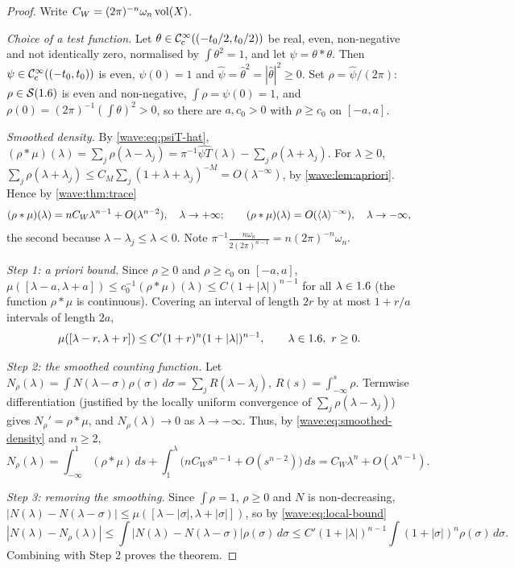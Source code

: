 \begin{proof}
Write $C_W=(2\pi)^{-n}\omega_n\operatorname{vol}(X)$.

\emph{Choice of a test function.} Let $\theta\in\mathcal{C}^\infty_{\mathrm{c}}((-t_0/2,t_0/2))$ be real, even,
non-negative and not identically zero, normalised by $\int\theta^2=1$, and let
$\psi=\theta*\theta$. Then $\psi\in\mathcal{C}^\infty_{\mathrm{c}}((-t_0,t_0))$ is even, $\psi(0)=1$ and
$\hat\psi=\hat\theta^2=|\hat\theta|^2\ge0$. Set $\rho=\hat\psi/(2\pi)$: $\rho\in\mathcal{S}(1.6)$ is even and
non-negative, $\int\rho=\psi(0)=1$, and $\rho(0)=(2\pi)^{-1}(\int\theta)^2>0$, so there are
$a,c_0>0$ with $\rho\ge c_0$ on $[-a,a]$.

\emph{Smoothed density.} By \eqref{wave:eq:psiT-hat},
$(\rho*\mu)(\lambda)=\sum_j\rho(\lambda-\lambda_j)=\pi^{-1}\widehat{\psi T}(\lambda)-\sum_j\rho(\lambda+\lambda_j)$. For
$\lambda\ge0$, $\sum_j\rho(\lambda+\lambda_j)\le C_M\sum_j(1+\lambda+\lambda_j)^{-M}=O(\lambda^{-\infty})$, by
\cref{wave:lem:apriori}. Hence by \cref{wave:thm:trace}
\begin{equation}\label{wave:eq:smoothed-density}
(\rho*\mu)(\lambda)=nC_W\lambda^{n-1}+O(\lambda^{n-2}),\quad\lambda\to+\infty;\qquad(\rho*\mu)(\lambda)=O(\langle \lambda\rangle^{-\infty}),\quad\lambda\to-\infty,
\end{equation}
the second because $\lambda-\lambda_j\le\lambda<0$. Note $\pi^{-1}\frac{n\omega_n}{2(2\pi)^{n-1}}=n(2\pi)^{-n}\omega_n$.

\emph{Step 1: a priori bound.} Since $\rho\ge0$ and $\rho\ge c_0$ on $[-a,a]$,
$\mu([\lambda-a,\lambda+a])\le c_0^{-1}(\rho*\mu)(\lambda)\le C(1+|\lambda|)^{n-1}$ for all $\lambda\in1.6$
(the function $\rho*\mu$ is continuous). Covering an interval of length $2r$ by at most
$1+r/a$ intervals of length $2a$,
\begin{equation}\label{wave:eq:local-bound}
\mu([\lambda-r,\lambda+r])\le C'(1+r)^n(1+|\lambda|)^{n-1},\qquad\lambda\in1.6,\ r\ge0 .
\end{equation}

\emph{Step 2: the smoothed counting function.} Let
$N_\rho(\lambda)=\int N(\lambda-\sigma)\rho(\sigma)\,d\sigma=\sum_jR(\lambda-\lambda_j)$, $R(s)=\int_{-\infty}^s\rho$.
Termwise differentiation (justified by the locally uniform convergence of
$\sum_j\rho(\lambda-\lambda_j)$) gives $N_\rho'=\rho*\mu$, and $N_\rho(\lambda)\to0$ as $\lambda\to-\infty$.
Thus, by \eqref{wave:eq:smoothed-density} and $n\ge2$,
\begin{equation*}
N_\rho(\lambda)=\int_{-\infty}^1(\rho*\mu)\,ds+\int_1^\lambda\big(nC_Ws^{n-1}+O(s^{n-2})\big)\,ds=C_W\lambda^n+O(\lambda^{n-1}).
\end{equation*}

\emph{Step 3: removing the smoothing.} Since $\int\rho=1$, $\rho\ge0$ and $N$ is
non-decreasing, $|N(\lambda)-N(\lambda-\sigma)|\le\mu([\lambda-|\sigma|,\lambda+|\sigma|])$, so by
\eqref{wave:eq:local-bound}
\begin{equation*}
|N(\lambda)-N_\rho(\lambda)|\le\int|N(\lambda)-N(\lambda-\sigma)|\rho(\sigma)\,d\sigma
\le C'(1+|\lambda|)^{n-1}\int(1+|\sigma|)^n\rho(\sigma)\,d\sigma .
\end{equation*}
Combining with Step 2 proves the theorem.
\end{proof}


